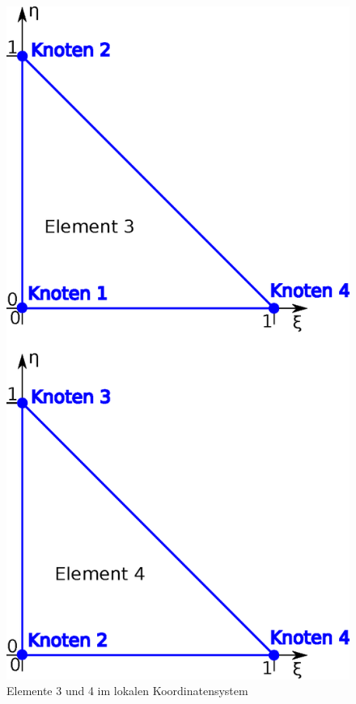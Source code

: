 \begin{figure}[htbp]
\begin{minipage}[t]{0.45\textwidth}
	\includegraphics[scale=0.5]{pics/neumann_boundary_assignment_elements_3_4.eps}
	\caption{Elemente 3 und 4 im lokalen Koordinatensystem}
	\label{fig:neumann_boundary_assignment_elements_3_4}
	\end{minipage}	
\end{figure}	

